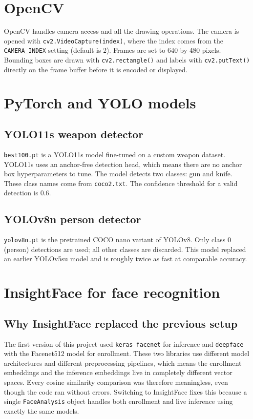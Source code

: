\documentclass[12pt,a4paper]{report}
\begin{document}
\section{OpenCV}

OpenCV handles camera access and all the drawing operations. The camera is opened with \texttt{cv2.VideoCapture(index)}, where the index comes from the \texttt{CAMERA\_INDEX} setting (default is 2). Frames are set to 640 by 480 pixels. Bounding boxes are drawn with \texttt{cv2.rectangle()} and labels with \texttt{cv2.putText()} directly on the frame buffer before it is encoded or displayed.

\section{PyTorch and YOLO models}

\subsection{YOLO11s weapon detector}

\texttt{best100.pt} is a YOLO11s model fine-tuned on a custom weapon dataset. YOLO11s uses an anchor-free detection head, which means there are no anchor box hyperparameters to tune. The model detects two classes: gun and knife. These class names come from \texttt{coco2.txt}. The confidence threshold for a valid detection is 0.6.

\subsection{YOLOv8n person detector}

\texttt{yolov8n.pt} is the pretrained COCO nano variant of YOLOv8. Only class 0 (person) detections are used; all other classes are discarded. This model replaced an earlier YOLOv5su model and is roughly twice as fast at comparable accuracy.

\section{InsightFace for face recognition}

\subsection{Why InsightFace replaced the previous setup}

The first version of this project used \texttt{keras-facenet} for inference and \texttt{deepface} with the Facenet512 model for enrollment. These two libraries use different model architectures and different preprocessing pipelines, which means the enrollment embeddings and the inference embeddings live in completely different vector spaces. Every cosine similarity comparison was therefore meaningless, even though the code ran without errors. Switching to InsightFace fixes this because a single \texttt{FaceAnalysis} object handles both enrollment and live inference using exactly the same models.
\end{document}
